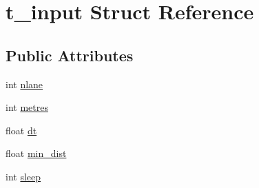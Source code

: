 \hypertarget{structt__input}{\section{t\-\_\-input \-Struct \-Reference}
\label{structt__input}
}
\subsection*{\-Public \-Attributes}
\begin{DoxyCompactItemize}
\item 
int \hyperlink{structt__input_a5eaf0211f0b1426e62599a05ed59fdad}{nlane}
\item 
int \hyperlink{structt__input_ad8a619bcac130645907c8d96501706e0}{metres}
\item 
float \hyperlink{structt__input_a65c0eaa1d49176526166daee469965ef}{dt}
\item 
float \hyperlink{structt__input_a57670cdbdff458ca01c55df3c53d9f39}{min\-\_\-dist}
\item 
int \hyperlink{structt__input_a12067219b44a45f4ad1a86cce07fc92f}{sleep}
\end{DoxyCompactItemize}


